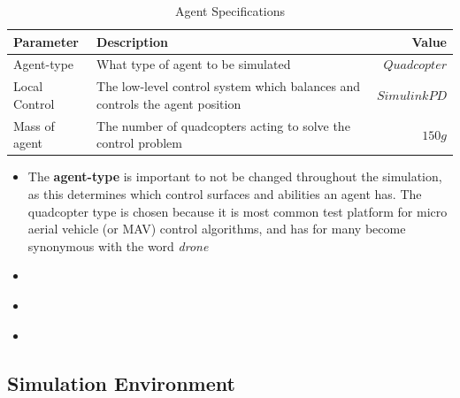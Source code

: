 \begin{table}[H]
\centering
\begin{tabularx}{1\textwidth}{l@{ }Xr}
\toprule
\textbf{Parameter}   & \textbf{Description}                                                        & \textbf{Value} \\ \midrule
Agent-type       	 & What type of agent to be simulated                                          & ${Quadcopter}$ \\
Local Control        & The low-level control system which balances and controls the agent position & ${Simulink PD}$\\
Mass of agent     	 & The number of quadcopters acting to solve the control problem               & ${150g}$        \\
\bottomrule
\end{tabularx}
\caption{Agent Specifications}
\label{tab:agent_specs}
\end{table}


\begin{itemize}
\item{The \textbf{agent-type} is important to not be changed throughout the simulation, as this determines which control surfaces and abilities an agent has. The quadcopter type is chosen because it is most common test platform for micro aerial vehicle (or MAV) control algorithms, and has for many become synonymous with the word \textit{drone} }	
\item{\textbf{}}	
\item{\textbf{}}	
\item{\textbf{}}	

\end{itemize}
\subsection{Simulation Environment}
\label{sec:environment}

